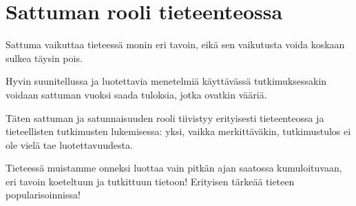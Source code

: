 \documentclass[
]{report}
\begin{document}
\hypertarget{sattuman-rooli-tieteenteossa}{%
\section{Sattuman rooli
tieteenteossa}\label{sattuman-rooli-tieteenteossa}}

Sattuma vaikuttaa tieteessä monin eri tavoin, eikä sen vaikutusta voida
koskaan sulkea täysin pois.

Hyvin suunitellussa ja luotettavia menetelmiä käyttävässä
tutkimuksessakin voidaan sattuman vuoksi saada tuloksia, jotka ovatkin
vääriä.

Täten sattuman ja satunnaisuuden rooli tiivistyy erityisesti
tieteenteossa ja tieteellisten tutkimusten lukemisessa: yksi, vaikka
merkittäväkin, tutkimustulos ei ole vielä tae luotettavuudesta.

Tieteessä muistamme onneksi luottaa vain pitkän ajan saatossa
kumuloituvaan, eri tavoin koeteltuun ja tutkittuun tietoon! Erityisen
tärkeää tieteen popularisoinnissa!
\end{document}
